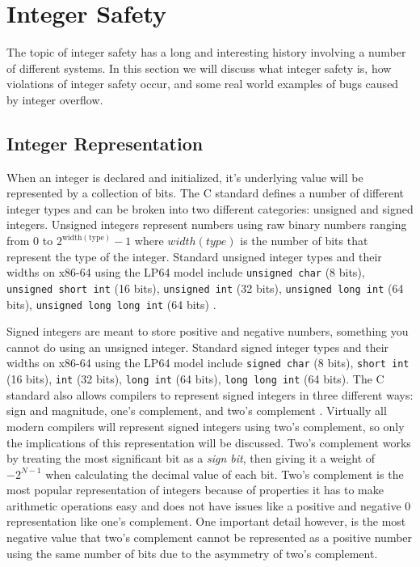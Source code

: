 \section{Integer Safety}

The topic of integer safety has a long and interesting history involving a number of different systems. In this section we will discuss what integer safety is, how violations of integer safety occur, and some real world examples of bugs caused by integer overflow.

\subsection{Integer Representation}

When an integer is declared and initialized, it's underlying value will be represented by a collection of bits. The C standard defines a number of different integer types and can be broken into two different categories: unsigned and signed integers. Unsigned integers represent numbers using raw binary numbers ranging from 0 to $2^{\text{width}(\text{type})} - 1$ where $width(type)$ is the number of bits that represent the type of the integer. Standard unsigned integer types and their widths on x86-64 using the LP64 model include \texttt{unsigned char} (8 bits), \texttt{unsigned short int} (16 bits), \texttt{unsigned int} (32 bits), \texttt{unsigned long int} (64 bits), \texttt{unsigned long long int} (64 bits) \cite{LP64}.

Signed integers are meant to store positive and negative numbers, something you cannot do using an unsigned integer. Standard signed integer types and their widths on x86-64 using the LP64 model include \texttt{signed char} (8 bits), \texttt{short int} (16 bits), \texttt{int} (32 bits), \texttt{long int} (64 bits), \texttt{long long int} (64 bits). The C standard also allows compilers to represent signed integers in three different ways: sign and magnitude, one's complement, and two's complement \cite{c_standard}. Virtually all modern compilers will represent signed integers using two's complement, so only the implications of this representation will be discussed. Two's complement works by treating the most significant bit as a \textit{sign bit}, then giving it a weight of $-2^{N - 1}$ when calculating the decimal value of each bit. Two's complement is the most popular representation of integers because of properties it has to make arithmetic operations easy and does not have issues like a positive and negative 0 representation like one's complement. One important detail however, is the most negative value that two's complement cannot be represented as a positive number using the same number of bits due to the asymmetry of two's complement.

